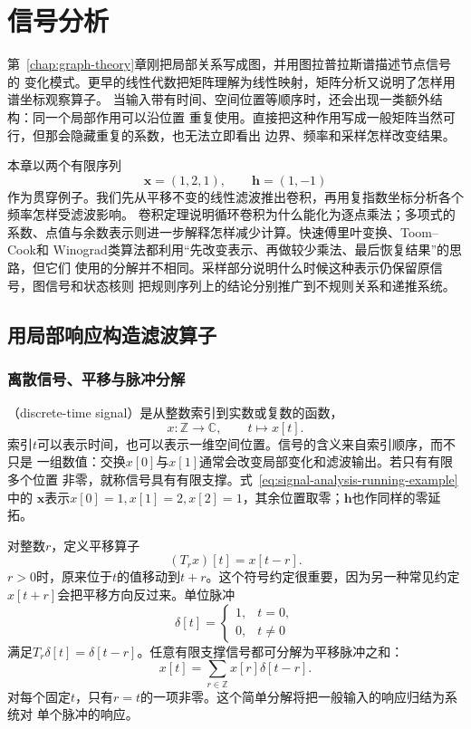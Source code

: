 \chapter{信号分析}
\label{chap:signal-analysis}

第~\ref{chap:graph-theory}章刚把局部关系写成图，并用图拉普拉斯谱描述节点信号的
变化模式。更早的线性代数把矩阵理解为线性映射，矩阵分析又说明了怎样用谱坐标观察算子。
当输入带有时间、空间位置等顺序时，还会出现一类额外结构：同一个局部作用可以沿位置
重复使用。直接把这种作用写成一般矩阵当然可行，但那会隐藏重复的系数，也无法立即看出
边界、频率和采样怎样改变结果。

本章以两个有限序列
\begin{equation}
  \bm{x}=(1,2,1),\qquad
  \bm{h}=(1,-1)
  \label{eq:signal-analysis-running-example}
\end{equation}
作为贯穿例子。我们先从平移不变的线性滤波推出卷积，再用复指数坐标分析各个频率怎样受滤波影响。
卷积定理说明循环卷积为什么能化为逐点乘法；多项式的系数、点值与余数表示则进一步解释怎样减少计算。快速傅里叶变换、Toom--Cook和
Winograd类算法都利用“先改变表示、再做较少乘法、最后恢复结果”的思路，但它们
使用的分解并不相同。采样部分说明什么时候这种表示仍保留原信号，图信号和状态核则
把规则序列上的结论分别推广到不规则关系和递推系统。

\section{用局部响应构造滤波算子}
\label{sec:signal-analysis-discrete-filtering}

\subsection{离散信号、平移与脉冲分解}

（discrete-time signal）是从整数索引到实数或复数的函数，
\[
  x:\mathbb{Z}\to\mathbb{C},\qquad t\mapsto x[t].
\]
索引$t$可以表示时间，也可以表示一维空间位置。信号的含义来自索引顺序，而不只是
一组数值：交换$x[0]$与$x[1]$通常会改变局部变化和滤波输出。若只有有限多个位置
非零，就称信号具有有限支撑。式~\eqref{eq:signal-analysis-running-example}中的
$\bm{x}$表示$x[0]=1,x[1]=2,x[2]=1$，其余位置取零；$\bm{h}$也作同样的零延拓。

对整数$r$，定义平移算子
\[
  (T_r x)[t]=x[t-r].
\]
$r>0$时，原来位于$t$的值移动到$t+r$。这个符号约定很重要，因为另一种常见约定
$x[t+r]$会把平移方向反过来。单位脉冲
\[
  \delta[t]=
  \begin{cases}
    1,&t=0,\\
    0,&t\neq0
  \end{cases}
\]
满足$T_r\delta[t]=\delta[t-r]$。任意有限支撑信号都可分解为平移脉冲之和：
\begin{equation}
  x[t]=\sum_{r\in\mathbb{Z}}x[r]\delta[t-r].
  \label{eq:signal-analysis-impulse-expansion}
\end{equation}
对每个固定$t$，只有$r=t$的一项非零。这个简单分解将把一般输入的响应归结为系统对
单个脉冲的响应。

